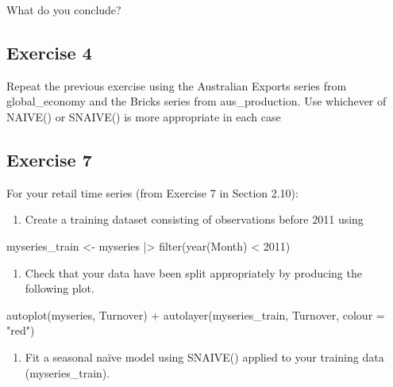 \documentclass[
  11pt,
]{article}
\newenvironment{Shaded}{\begin{snugshade}}{\end{snugshade}}
\newcommand{\NormalTok}[1]{\textcolor[rgb]{0.00,0.23,0.31}{#1}}
\providecommand{\tightlist}{%
  \setlength{\itemsep}{0pt}\setlength{\parskip}{0pt}}\usepackage{longtable,booktabs,array}
\begin{document}
What do you conclude?

\subsection{Exercise 4}\label{exercise-4}

Repeat the previous exercise using the Australian Exports series from
global\_economy and the Bricks series from aus\_production. Use
whichever of NAIVE() or SNAIVE() is more appropriate in each case

\subsection{Exercise 7}\label{exercise-7}

For your retail time series (from Exercise 7 in Section 2.10):

\begin{enumerate}
\def\labelenumi{\alph{enumi}.}
\tightlist
\item
  Create a training dataset consisting of observations before 2011 using
\end{enumerate}

\begin{Shaded}
\begin{Highlighting}[]
\NormalTok{myseries\_train \textless{}{-} myseries |\textgreater{}}
\NormalTok{  filter(year(Month) \textless{} 2011)}
\end{Highlighting}
\end{Shaded}

\begin{enumerate}
\def\labelenumi{\alph{enumi}.}
\setcounter{enumi}{1}
\tightlist
\item
  Check that your data have been split appropriately by producing the
  following plot.
\end{enumerate}

\begin{Shaded}
\begin{Highlighting}[]
\NormalTok{autoplot(myseries, Turnover) +}
\NormalTok{  autolayer(myseries\_train, Turnover, colour = "red")}
\end{Highlighting}
\end{Shaded}

\begin{enumerate}
\def\labelenumi{\alph{enumi}.}
\setcounter{enumi}{2}
\tightlist
\item
  Fit a seasonal naïve model using SNAIVE() applied to your training
  data (myseries\_train).
\end{enumerate}
\end{document}
